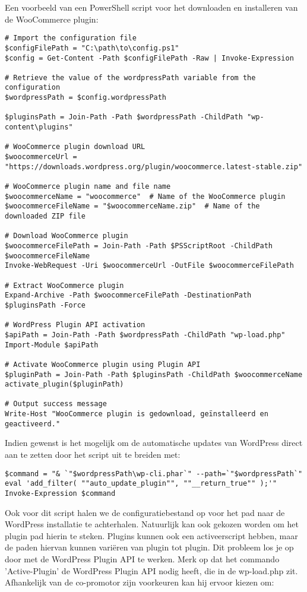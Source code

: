 Een voorbeeld van een PowerShell script voor het downloaden en installeren van de WooCommerce plugin:
\begin{verbatim}
# Import the configuration file
$configFilePath = "C:\path\to\config.ps1"
$config = Get-Content -Path $configFilePath -Raw | Invoke-Expression

# Retrieve the value of the wordpressPath variable from the configuration
$wordpressPath = $config.wordpressPath

$pluginsPath = Join-Path -Path $wordpressPath -ChildPath "wp-content\plugins"  

# WooCommerce plugin download URL
$woocommerceUrl = "https://downloads.wordpress.org/plugin/woocommerce.latest-stable.zip" 

# WooCommerce plugin name and file name
$woocommerceName = "woocommerce"  # Name of the WooCommerce plugin
$woocommerceFileName = "$woocommerceName.zip"  # Name of the downloaded ZIP file

# Download WooCommerce plugin
$woocommerceFilePath = Join-Path -Path $PSScriptRoot -ChildPath $woocommerceFileName
Invoke-WebRequest -Uri $woocommerceUrl -OutFile $woocommerceFilePath

# Extract WooCommerce plugin
Expand-Archive -Path $woocommerceFilePath -DestinationPath $pluginsPath -Force

# WordPress Plugin API activation
$apiPath = Join-Path -Path $wordpressPath -ChildPath "wp-load.php"
Import-Module $apiPath

# Activate WooCommerce plugin using Plugin API
$pluginPath = Join-Path -Path $pluginsPath -ChildPath $woocommerceName 
activate_plugin($pluginPath)

# Output success message
Write-Host "WooCommerce plugin is gedownload, geïnstalleerd en geactiveerd."
\end{verbatim}
Indien gewenst is het mogelijk om de automatische updates van WordPress direct aan te zetten door het script uit te breiden met:
\begin{verbatim}
$command = "& `"$wordpressPath\wp-cli.phar`" --path=`"$wordpressPath`" eval 'add_filter( ""auto_update_plugin"", ""__return_true"" );'"
Invoke-Expression $command
\end{verbatim}
Ook voor dit script halen we de configuratiebestand op voor het pad naar de WordPress installatie te achterhalen. Natuurlijk kan ook gekozen worden om het plugin pad hierin te steken. Plugins kunnen ook een activeerscript hebben, maar de paden hiervan kunnen variëren van plugin tot plugin. Dit probleem los je op door met de WordPress Plugin API te werken. Merk op dat het commando 'Active-Plugin' de WordPress Plugin API nodig heeft, die in de wp-load.php zit. Afhankelijk van de co-promotor zijn voorkeuren kan hij ervoor kiezen om:
